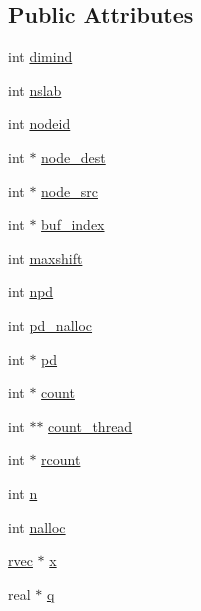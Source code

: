 \subsection*{\-Public \-Attributes}
\begin{DoxyCompactItemize}
\item 
int \hyperlink{structpme__atomcomm__t_a8c864e347140877de0427a1319870508}{dimind}
\item 
int \hyperlink{structpme__atomcomm__t_a7067abdbcff53031d921aecbfbdd3e45}{nslab}
\item 
int \hyperlink{structpme__atomcomm__t_a75665caca7eb2e8ee77c58e72b55270d}{nodeid}
\item 
int $\ast$ \hyperlink{structpme__atomcomm__t_ab1cce1e8dc54253a956f78571a321eb7}{node\-\_\-dest}
\item 
int $\ast$ \hyperlink{structpme__atomcomm__t_a3eb8c9e29183fd793a2f5d941d1c7cbb}{node\-\_\-src}
\item 
int $\ast$ \hyperlink{structpme__atomcomm__t_a1c56d8d2a2c5f6be749a82fdeddd60ef}{buf\-\_\-index}
\item 
int \hyperlink{structpme__atomcomm__t_a3295f00b5d23495d970639d2cd9af4be}{maxshift}
\item 
int \hyperlink{structpme__atomcomm__t_a096742fbe9e931be356485caacc3f179}{npd}
\item 
int \hyperlink{structpme__atomcomm__t_a2b06aceeea00d4658a9dffcefd22501e}{pd\-\_\-nalloc}
\item 
int $\ast$ \hyperlink{structpme__atomcomm__t_a0ae87d1bda952dcb96e18c4f5fc2a4b0}{pd}
\item 
int $\ast$ \hyperlink{structpme__atomcomm__t_a299ce71c7cb10b78e167443a8dabbb17}{count}
\item 
int $\ast$$\ast$ \hyperlink{structpme__atomcomm__t_a7268dacda87fc6b699ee9963a53fef51}{count\-\_\-thread}
\item 
int $\ast$ \hyperlink{structpme__atomcomm__t_ada8b7c19b3251532dd8886077290e6b3}{rcount}
\item 
int \hyperlink{structpme__atomcomm__t_ae8dbde03051b3c40ea5793d2b0452949}{n}
\item 
int \hyperlink{structpme__atomcomm__t_a506b271fa83ee67ef73880d57439befb}{nalloc}
\item 
\hyperlink{share_2template_2gromacs_2types_2simple_8h_aa02a552a4abd2f180c282a083dc3a999}{rvec} $\ast$ \hyperlink{structpme__atomcomm__t_a10af7db834b7468338c94dcbc1fea186}{x}
\item 
real $\ast$ \hyperlink{structpme__atomcomm__t_a5c7c32dd4fd796a64cc021c29bda40c4}{q}
$$
\end{DoxyCompactItemize}
